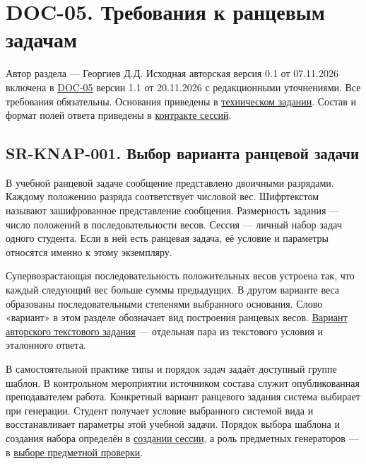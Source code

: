 \documentclass[12pt,a4paper]{article}
\begin{document}
\section{DOC-05. Требования к ранцевым задачам}\label{doc-05-ux442ux440ux435ux431ux43eux432ux430ux43dux438ux44f-ux43a-ux440ux430ux43dux446ux435ux432ux44bux43c-ux437ux430ux434ux430ux447ux430ux43c}

\hypertarget{doc-05-требования-к-ранцевым-задачам}{}

Автор раздела --- Георгиев Д.Д. Исходная авторская версия 0.1 от 07.11.2026 включена в {\hyperlink{doc-05-системные-требования}{DOC-05}} версии 1.1 от 20.11.2026 с редакционными уточнениями. Все требования обязательны. Основания приведены в {\href{../02\_Техническое\_задание/DOC-02\_Техническое\_задание.pdf\#doc-02-техническое-задание}{техническом задании}}. Состав и формат полей ответа приведены в {\href{../07\_Программные\_требования/DOC-06.2\_Сессии\_задач\_и\_планировщик.pdf\#ранцевая-задача}{контракте сессий}}.

\subsection{SR-KNAP-001. Выбор варианта ранцевой задачи}\label{sr-knap-001-ux432ux44bux431ux43eux440-ux432ux430ux440ux438ux430ux43dux442ux430-ux440ux430ux43dux446ux435ux432ux43eux439-ux437ux430ux434ux430ux447ux438}

\hypertarget{sr-knap-001-выбор-варианта-ранцевой-задачи}{}

\hypertarget{sr-knap-001}{}

В учебной ранцевой задаче сообщение представлено двоичными разрядами. Каждому положению разряда соответствует числовой вес. Шифртекстом называют зашифрованное представление сообщения. Размерность задания --- число положений в последовательности весов. Сессия --- личный набор задач одного студента. Если в ней есть ранцевая задача, её условие и параметры относятся именно к этому экземпляру.

Супервозрастающая последовательность положительных весов устроена так, что каждый следующий вес больше суммы предыдущих. В другом варианте веса образованы последовательными степенями выбранного основания. Слово «вариант» в этом разделе обозначает вид построения ранцевых весов. {\hyperlink{sr-cfg-006-авторское-задание-с-вариантами}{Вариант авторского текстового задания}} --- отдельная пара из текстового условия и эталонного ответа.

В самостоятельной практике типы и порядок задач задаёт доступный группе шаблон. В контрольном мероприятии источником состава служит опубликованная преподавателем работа. Конкретный вариант ранцевого задания система выбирает при генерации. Студент получает условие выбранного системой вида и восстанавливает параметры этой учебной задачи. Порядок выбора шаблона и создания набора определён в {\hyperlink{sr-ses-001-создание-набора-по-шаблону-группы}{создании сессии}}, а роль предметных генераторов --- в {\hyperlink{sr-ses-004-выбор-предметной-проверки}{выборе предметной проверки}}.
\end{document}
